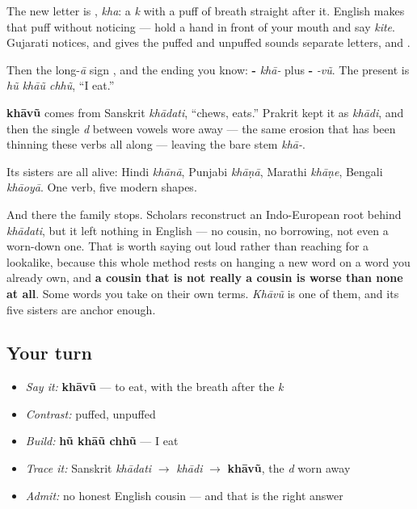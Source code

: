 The new letter is \textbf{}, \emph{kha}: a \emph{k} with a puff of breath straight after it. English makes that puff without noticing — hold a hand in front of your mouth and say \emph{kite}. Gujarati notices, and gives the puffed and unpuffed sounds separate letters, \textbf{} and \textbf{}.

Then the long-\emph{ā} sign \textbf{}, and the ending you know: \textbf{-} \emph{khā-} plus \textbf{-} \emph{-vũ}. The present is \emph{hũ khāũ chhũ}, \textquotedblleft{}I eat.\textquotedblright{}

\begin{cousinweb}
\textbf{khāvũ} comes from Sanskrit \emph{khādati}, \textquotedblleft{}chews, eats.\textquotedblright{} Prakrit kept it as \emph{khādi}, and then the single \emph{d} between vowels wore away — the same erosion that has been thinning these verbs all along — leaving the bare stem \emph{khā-}.

Its sisters are all alive: Hindi \emph{khānā}, Punjabi \emph{khāṇā}, Marathi \emph{khāṇe}, Bengali \emph{khāoyā}. One verb, five modern shapes.

And there the family stops. Scholars reconstruct an Indo-European root behind \emph{khādati}, but it left nothing in English — no cousin, no borrowing, not even a worn-down one. That is worth saying out loud rather than reaching for a lookalike, because this whole method rests on hanging a new word on a word you already own, and \textbf{a cousin that is not really a cousin is worse than none at all}. Some words you take on their own terms. \emph{Khāvũ} is one of them, and its five sisters are anchor enough.
\end{cousinweb}

\subsection*{Your turn}
\begin{itemize}
\raggedright
  \item \emph{Say it:} \textbf{khāvũ} — to eat, with the breath after the \emph{k}
  \item \emph{Contrast:} \textbf{} puffed, \textbf{} unpuffed
  \item \emph{Build:} \textbf{hũ khāũ chhũ} — I eat
  \item \emph{Trace it:} Sanskrit \emph{khādati} $\to$ \emph{khādi} $\to$ \textbf{khāvũ}, the \emph{d} worn away
  \item \emph{Admit:} no honest English cousin — and that is the right answer
\end{itemize}

